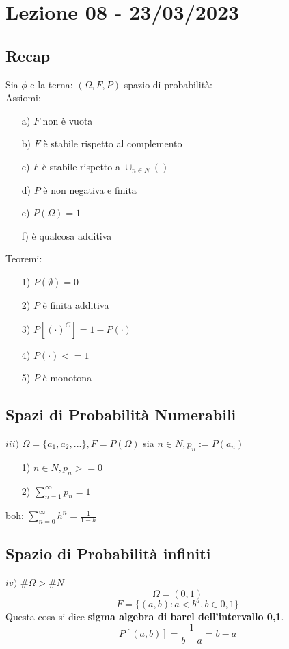 \section{Lezione 08 - 23/03/2023}

\subsection{Recap}
Sia $\phi$ e la terna: $(\Omega, F, P)$ spazio di probabilità:\\
Assiomi:
\begin{itemize}
\item[a)] $F$ non è vuota
\item[b)] $F$ è stabile rispetto al complemento
\item[c)] $F$ è stabile rispetto a $\cup_{n \in N}()$
\item[d)] $P$ è non negativa e finita
\item[e)] $P(\Omega) = 1$
\item[f)] è qualcosa additiva
\end{itemize}
Teoremi:
\begin{itemize}
\item[1)] $P(\emptyset) = 0$
\item[2)] $P$ è finita additiva
\item[3)] $P[(\cdot)^C] = 1-P(\cdot)$
\item[4)] $P(\cdot) <= 1$
\item[5)] $P$ è monotona
\end{itemize}

\subsection{Spazi di Probabilità Numerabili}
$iii)$ $\Omega = \{a_1, a_2,...\}, F = P(\Omega)$
sia $n \in N, p_n:= P({a_n})$
\begin{itemize}
\item[1)] $n \in N, p_n >= 0$
\item[2)] $ \sum_{n=1}^{\infty} p_n = 1$
\end{itemize}
boh: $ \sum_{n=0}^{\infty} h^n = \frac{1}{1-h}$

\subsection{Spazio di Probabilità infiniti}
$iv)$ $\#\Omega > \#N$ \\
$$ \Omega = (0,1)$$
$$ F = \{ (a,b): a<b ^ a,b \in 0,1 \} $$
Questa cosa si dice \textbf{sigma algebra di barel dell'intervallo 0,1}.\\
$$ P[(a,b)] = \frac{1}{b-a} = b-a $$

